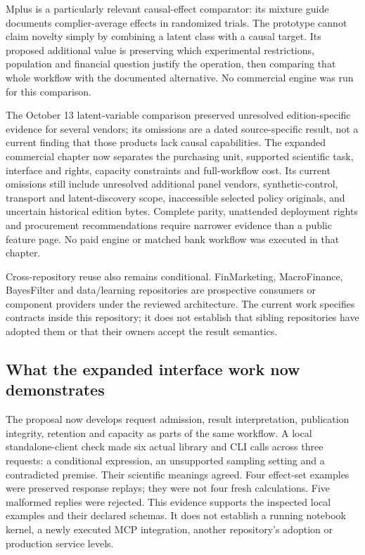 Mplus is a particularly relevant causal-effect comparator: its mixture
guide documents complier-average effects in randomized trials. The
prototype cannot claim novelty simply by combining a latent class with a
causal target. Its proposed additional value is preserving which
experimental restrictions, population and financial question justify the
operation, then comparing that whole workflow with the documented
alternative. No commercial engine was run for this comparison.
\citep{exec13_latent_mplus}

The October 13 latent-variable comparison preserved unresolved
edition-specific evidence for several vendors; its omissions are a dated
source-specific result, not a current finding that those products lack
causal capabilities. The expanded commercial chapter now separates the
purchasing unit, supported scientific task, interface and rights,
capacity constraints and full-workflow cost. Its current omissions still
include unresolved additional panel vendors, synthetic-control,
transport and latent-discovery scope, inaccessible selected policy
originals, and uncertain historical edition bytes. Complete parity,
unattended deployment rights and procurement recommendations require
narrower evidence than a public feature page. No paid engine or matched
bank workflow was executed in that chapter.
\citep{sp13_commercial,sp18_commercial}

Cross-repository reuse also remains conditional. FinMarketing,
MacroFinance, BayesFilter and data/learning repositories are prospective
consumers or component providers under the reviewed architecture. The
current work specifies contracts inside this repository; it does not
establish that sibling repositories have adopted them or that their
owners accept the result semantics. \citep{sp13_interfaces}

\hypertarget{what-the-expanded-interface-work-now-demonstrates}{%
\subsection{What the expanded interface work now
demonstrates}\label{what-the-expanded-interface-work-now-demonstrates}}

The proposal now develops request admission, result interpretation,
publication integrity, retention and capacity as parts of the same
workflow. A local standalone-client check made six actual library and
CLI calls across three requests: a conditional expression, an
unsupported sampling setting and a contradicted premise. Their
scientific meanings agreed. Four effect-set examples were preserved
response replays; they were not four fresh calculations. Five malformed
replies were rejected. This evidence supports the inspected local
examples and their declared schemas. It does not establish a running
notebook kernel, a newly executed MCP integration, another repository's
adoption or production service levels. \citep{sp18_clients}

